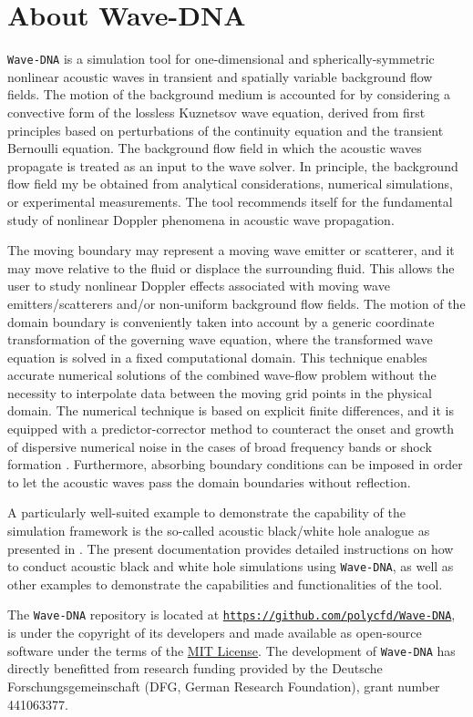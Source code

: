 \chapter{About Wave-DNA}
\label{chap:About Wave-DNA}

{\tt Wave-DNA} is a simulation tool for one-dimensional and spherically-symmetric nonlinear acoustic waves in transient and spatially variable background flow fields. The motion of the background medium is accounted for by considering a convective form of the lossless Kuznetsov wave equation, derived from first principles based on perturbations of the continuity equation and the transient Bernoulli equation. The background flow field in which the acoustic waves propagate is treated as an input to the wave solver. In principle, the background flow field my be obtained from analytical considerations, numerical simulations, or experimental measurements. The tool recommends itself for the fundamental study of nonlinear Doppler phenomena in acoustic wave propagation.

The moving boundary may represent a moving wave emitter or scatterer, and it may move relative to the fluid or displace the surrounding fluid. This allows the user to study nonlinear Doppler effects associated with moving wave emitters/scatterers and/or non-uniform background flow fields. The motion of the domain boundary is conveniently taken into account by a generic coordinate transformation of the governing wave equation, where the transformed wave equation is solved in a fixed computational domain. This technique enables accurate numerical solutions of the combined wave-flow problem without the necessity to interpolate data between the moving grid points in the physical domain. The numerical technique is based on explicit finite differences, and it is equipped with a predictor-corrector method to counteract the onset and growth of dispersive numerical noise in the cases of broad frequency bands or shock formation \citep{Schenke_et_al_2022}. Furthermore, absorbing boundary conditions can be imposed in order to let the acoustic waves pass the domain boundaries without reflection.

A particularly well-suited example to demonstrate the capability of the simulation framework is the so-called acoustic black/white hole analogue as presented in \citep{Schenke_et_al_2022_PoF}. The present documentation provides detailed instructions on how to conduct acoustic black and white hole simulations using {\tt Wave-DNA}, as well as other examples to demonstrate the capabilities and functionalities of the tool.

The {\tt Wave-DNA} repository is located at \href{https://github.com/polycfd/Wave-DNA}{\texttt{https://github.com/polycfd/Wave-DNA}}, is under the copyright of its developers and made available as open-source software under the terms of the \href{https://opensource.org/license/mit/}{MIT License}. The development of {\tt Wave-DNA} has directly benefitted from research funding provided by the Deutsche Forschungsgemeinschaft (DFG, German Research Foundation), grant number 441063377.


